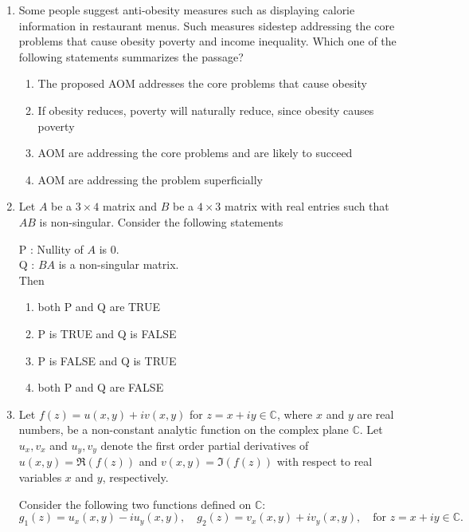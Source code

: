 \documentclass[journal,12pt,onecolumn]{IEEEtran}
\theoremstyle{remark}
\begin{document}
\begin{enumerate}[start=1, label=Q.\arabic*]
\hfill{}


\item Some people suggest anti-obesity measures  such as displaying calorie information in restaurant menus.  
Such measures sidestep addressing the core problems that cause obesity\brak{:} poverty and income inequality.  
Which one of the following statements summarizes the passage?
\begin{enumerate}
\item The proposed AOM addresses the core problems that cause obesity
\item If obesity reduces, poverty will naturally reduce, since obesity causes poverty
\item AOM are addressing the core problems and are likely to succeed
\item AOM are addressing the problem superficially
\end{enumerate}

\hfill{}
\item Let $A$ be a $3 \times 4$ matrix and $B$ be a $4 \times 3$ matrix with real entries such that $AB$ is non\mbox{-}singular. Consider the following statements\brak{:}

P : Nullity of $A$ is $0$.\\
Q : $BA$ is a non\mbox{-}singular matrix.\\

Then
\begin{enumerate}
\item both P and Q are TRUE
\item P is TRUE and Q is FALSE
\item P is FALSE and Q is TRUE
\item both P and Q are FALSE
\end{enumerate}

\hfill{}
\item Let $f(z)=u(x,y)+i v(x,y)$ for $z=x+iy \in \mathbb{C}$, where $x$ and $y$ are real numbers, be a non\mbox{-}constant analytic function on the complex plane $\mathbb{C}$.  
Let $u_x, v_x$ and $u_y, v_y$ denote the first order partial derivatives of $u(x,y)=\Re(f(z))$ and $v(x,y)=\Im(f(z))$ with respect to real variables $x$ and $y$, respectively.  

Consider the following two functions defined on $\mathbb{C}$:  
\[
g_1(z)=u_x(x,y)-i u_y(x,y), \quad g_2(z)=v_x(x,y)+i v_y(x,y), \quad \text{for } z=x+iy \in \mathbb{C}.
\]


\end{enumerate}
\end{document}

